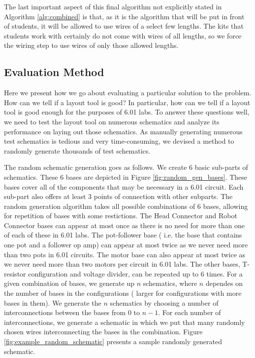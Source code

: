 The last important aspect of this final algorithm not explicitly stated in
Algorithm \ref{alg:combined} is that, as it is the algorithm that will be put
in front of students, it will be allowed to use wires of a select few lengths.
The kits that students work with certainly do not come with wires of all lengths,
so we force the wiring step to use wires of only those allowed lengths.

\subsection{Evaluation Method}

Here we present how we go about evaluating a particular solution to the problem.
How can we tell if a layout tool is good? In particular, how can we tell if a
layout tool is good enough for the purposes of 6.01 labs. To answer these
questions well, we need to test the layout tool on numerous schematics and
analyze its performance on laying out those schematics. As manually generating
numerous test schematics is tedious and very time-consuming, we devised a method
to randomly generate thousands of test schematics.

The random schematic generation goes as follows. We create $6$ basic sub-parts
of schematics. These $6$ bases are depicted in Figure
\ref{fig:random_gen_bases}. These bases cover all of the components that may be
necessary in a 6.01 circuit. Each sub-part also offers at least $3$ points of
connection with other subparts. The random generation algorithm takes all
possible combinations of
$6$ bases, allowing for repetition of bases with some restictions.
The Head Connector and Robot Connector bases can appear at most once as there is
no need for more than one of each of these in 6.01 labs. The pot-follower base (
i.e. the base that contains one pot and a follower op amp) can appear at most
twice as we never need more than two pots in 6.01 circuits. The motor base can
also appear at most twice as we never need more than two motors per circuit in
6.01 labs. The other bases, T-resistor configuration and voltage divider, can be
repeated up to 6 times. For a given combination of bases, we generate up $n$
schematics, where $n$ dependes on the number of bases in the configurations (
larger for configurations with more bases in them).
We generate the $n$ schematics by choosing a number of interconnections between
the bases from $0$ to $n-1$. For each number of interconnections, we generate
a schematic in which we put that many randomly chosen wires interconnecting
the bases in the combination. Figure \ref{fig:example_random_schematic} presents
a sample randomly generated schematic.

